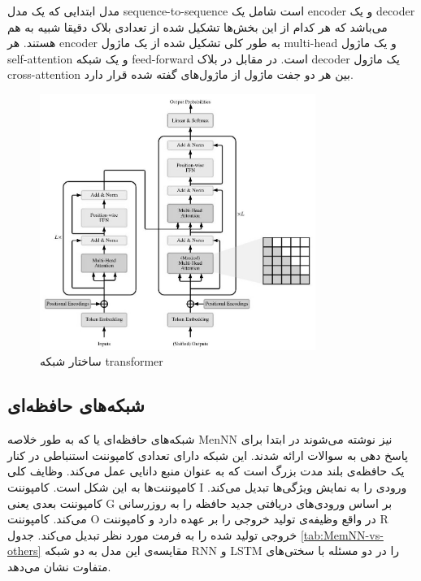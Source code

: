 \documentclass[12pt, a4paper, oneside]{report}
\begin{document}
مدل ابتدایی که یک مدل
sequence-to-sequence
است شامل یک
encoder
و یک
decoder
می‌باشد که هر کدام از این بخش‌ها تشکیل شده از تعدادی بلاک دقیقا شبیه به هم هستند. هر
encoder
به طور کلی تشکیل شده از یک ماژول
multi-head
و یک ماژول
self-attention
و یک شبکه 
feed-forward
است. در مقابل در بلاک
decoder
یک ماژول
cross-attention
بین هر دو جفت ماژول از ماژول‌های گفته شده قرار دارد.\cite{lin2021survey}

\begin{figure}[h]
    \centering
    \includegraphics[width=0.8\textwidth]{transformer}
    \caption{ ساختار شبکه transformer }
    \label{fig:transformer}
\end{figure}

\subsection{شبکه‌های حافظه‌ای}
شبکه‌های حافظه‌ای یا
که به طور خلاصه
MenNN
نیز نوشته می‌شوند در ابتدا برای پاسخ دهی به سوالات ارائه شدند. این شبکه دارای تعدادی کامپوننت استنباطی در کنار یک
حافظه‌ی بلند مدت بزرگ است که به عنوان منبع دانایی عمل می‌کند. وظایف کلی کامپوننت‌ها به این شکل است. کامپوننت
I
ورودی را به نمایش ویژگی‌ها تبدیل می‌کند. کامپوننت بعدی یعنی
G
بر اساس ورودی‌های دریافتی جدید حافظه را به روزرسانی می‌کند. کامپوننت
O
در واقع وظیفه‌ی تولید خروجی را بر عهده دارد و کامپوننت
R
خروجی تولید شده را به فرمت مورد نظر تبدیل می‌کند. جدول
\ref{tab:MemNN-vs-others}
مقایسه‌ی این مدل به دو شبکه
RNN
و
LSTM
را در دو مسئله با سختی‌های متفاوت نشان می‌دهد.
\cite{zhang2018deep}
\end{document}
